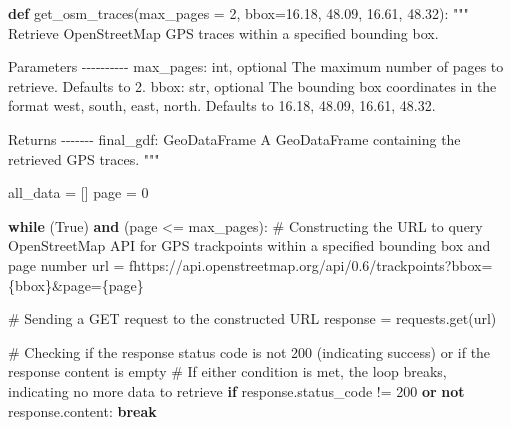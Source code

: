 \documentclass[
  letterpaper,
  DIV=11,
  numbers=noendperiod]{scrreprt}
\newenvironment{Shaded}{\begin{snugshade}}{\end{snugshade}}
\newcommand{\CommentTok}[1]{\textcolor[rgb]{0.37,0.37,0.37}{#1}}
\newcommand{\ControlFlowTok}[1]{\textcolor[rgb]{0.00,0.23,0.31}{\textbf{#1}}}
\newcommand{\DecValTok}[1]{\textcolor[rgb]{0.68,0.00,0.00}{#1}}
\newcommand{\KeywordTok}[1]{\textcolor[rgb]{0.00,0.23,0.31}{\textbf{#1}}}
\newcommand{\NormalTok}[1]{\textcolor[rgb]{0.00,0.23,0.31}{#1}}
\newcommand{\OperatorTok}[1]{\textcolor[rgb]{0.37,0.37,0.37}{#1}}
\newcommand{\SpecialCharTok}[1]{\textcolor[rgb]{0.37,0.37,0.37}{#1}}
\newcommand{\SpecialStringTok}[1]{\textcolor[rgb]{0.13,0.47,0.30}{#1}}
\newcommand{\StringTok}[1]{\textcolor[rgb]{0.13,0.47,0.30}{#1}}
\newcommand{\VariableTok}[1]{\textcolor[rgb]{0.07,0.07,0.07}{#1}}
\begin{document}
\begin{Shaded}
\begin{Highlighting}[]
\KeywordTok{def}\NormalTok{ get\_osm\_traces(max\_pages }\OperatorTok{=} \DecValTok{2}\NormalTok{,  bbox}\OperatorTok{=}\StringTok{\textquotesingle{}16.18, 48.09, 16.61, 48.32\textquotesingle{}}\NormalTok{):}
    \CommentTok{"""}
\CommentTok{    Retrieve OpenStreetMap GPS traces within a specified bounding box.}

\CommentTok{    Parameters}
\CommentTok{    {-}{-}{-}{-}{-}{-}{-}{-}{-}{-}}
\CommentTok{    max\_pages: int, optional}
\CommentTok{        The maximum number of pages to retrieve. Defaults to 2.}
\CommentTok{    bbox: str, optional}
\CommentTok{        The bounding box coordinates in the format \textquotesingle{}west, south, east, north\textquotesingle{}. Defaults to \textquotesingle{}16.18, 48.09, 16.61, 48.32\textquotesingle{}.}

\CommentTok{    Returns}
\CommentTok{    {-}{-}{-}{-}{-}{-}{-}}
\CommentTok{    final\_gdf: GeoDataFrame}
\CommentTok{        A GeoDataFrame containing the retrieved GPS traces.}
\CommentTok{    """}
    
\NormalTok{    all\_data }\OperatorTok{=}\NormalTok{ []}
\NormalTok{    page }\OperatorTok{=} \DecValTok{0}
    
    \ControlFlowTok{while}\NormalTok{ (}\VariableTok{True}\NormalTok{) }\KeywordTok{and}\NormalTok{ (page }\OperatorTok{\textless{}=}\NormalTok{ max\_pages):}
        \CommentTok{\# Constructing the URL to query OpenStreetMap API for GPS trackpoints within a specified bounding box and page number}
\NormalTok{        url }\OperatorTok{=} \SpecialStringTok{f\textquotesingle{}https://api.openstreetmap.org/api/0.6/trackpoints?bbox=}\SpecialCharTok{\{}\NormalTok{bbox}\SpecialCharTok{\}}\SpecialStringTok{\&page=}\SpecialCharTok{\{}\NormalTok{page}\SpecialCharTok{\}}\SpecialStringTok{\textquotesingle{}}
        
        \CommentTok{\# Sending a GET request to the constructed URL}
\NormalTok{        response }\OperatorTok{=}\NormalTok{ requests.get(url)}
        
        \CommentTok{\# Checking if the response status code is not 200 (indicating success) or if the response content is empty}
        \CommentTok{\# If either condition is met, the loop breaks, indicating no more data to retrieve}
        \ControlFlowTok{if}\NormalTok{ response.status\_code }\OperatorTok{!=} \DecValTok{200} \KeywordTok{or} \KeywordTok{not}\NormalTok{ response.content:}
            \ControlFlowTok{break}
        

\end{Highlighting}
\end{Shaded}
\end{document}

